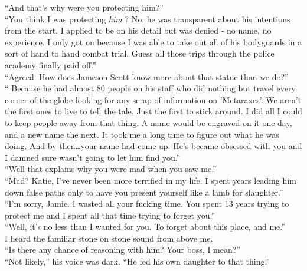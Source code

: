 \documentclass[a5paper]{scrartcl}
\begin{document}
\enquote{And that's why were you protecting him?}\\


\enquote{You think I was protecting \textit{him}
? No, he was transparent about his intentions from the start. I applied to be on his detail but was denied - no name, no experience. I only got on because I was able to take out all of his bodyguards in a sort of hand to hand combat trial. Guess all those trips through the police academy finally paid off.}\\


\enquote{Agreed. How does Jameson Scott know more about that statue than we do?}\\


\enquote{ Because he had almost 80 people on his staff who did nothing but travel every corner of the globe looking for any scrap of information on 'Metaraxes'.  We aren't the first ones to live to tell the tale. Just the first to stick around.  I did all I could to keep people away from that thing. A name would be engraved on it one day, and a new name the next. It took me a long time to figure out what he was doing. And by then\dots your name had come up. He's became obsessed with you and I damned sure wasn't going to let him find you.}\\


\enquote{Well that explains why you were mad when you saw me.}\\


\enquote{Mad? Katie, I've never been more terrified in my life. I spent years leading him down false paths only to have you present yourself like a lamb for slaughter.}\\


\enquote{I'm sorry, Jamie. I wasted all your fucking time.  You spent 13 years trying to protect me and I spent all that time trying to forget you.} \\


\enquote{Well, it's no less than I wanted for you. To forget about this place, and me.}\\


I heard the familiar stone on stone sound from above me. \\


\enquote{Is there any chance of reasoning with him? Your boss, I mean?}\\


\enquote{Not likely,} his voice was dark. \enquote{He fed his own daughter to that thing.}\\
\end{document}
